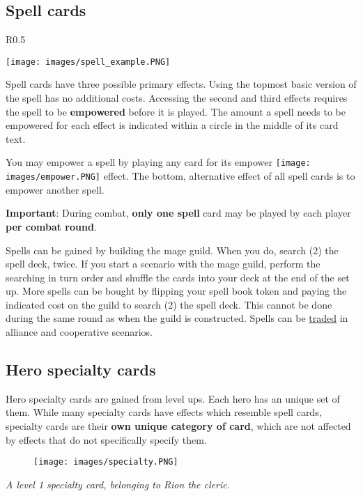 \documentclass[12pt]{article}
\begin{document}
\clearpage

\subsection*{\hypertarget{spells}{Spell cards}}
\begin{wrapfigure}{R}{0.5\textwidth}
    \begin{center}
    \texttt{[image: images/spell\_example.PNG]}
    \end{center}
\end{wrapfigure}
Spell cards have three possible primary effects. Using the topmost basic version of the spell has no additional costs. Accessing the second and third effects requires the spell to be \textbf{empowered} before it is played. The amount a spell needs to be empowered for each effect is indicated within a circle in the middle of its card text.\par
You may empower a spell by playing any card for its empower \texttt{[image: images/empower.PNG]} effect. The bottom, alternative effect of all spell cards is to empower another spell.\par
\textbf{Important}: During combat, \textbf{only one spell} card may be played by each player \textbf{per combat round}.\par
Spells can be gained by building the mage guild. When you do, search (2) the spell deck, twice. If you start a scenario with the mage guild, perform the searching in turn order and shuffle the cards into your deck at the end of the set up. More spells can be bought by flipping your spell book token and paying the indicated cost on the guild to search (2) the spell deck. This cannot be done during the same round as when the guild is constructed. Spells can be \hyperlink{Trading}{traded} in alliance and cooperative scenarios.

\subsection*{\hypertarget{Specialty}{Hero specialty cards}}
Hero specialty cards are gained from level ups. Each hero has an unique set of them. While many specialty cards have effects which resemble spell cards, specialty cards are their \textbf{own unique category of card}, which are not affected by effects that do not specifically specify them.
\par

\begin{figure}[h]
\centering
\texttt{[image: images/specialty.PNG]}
\end{figure}
\begin{center}
\textit{A level 1 specialty card, belonging to Rion the cleric.}
\end{center}
\end{document}
